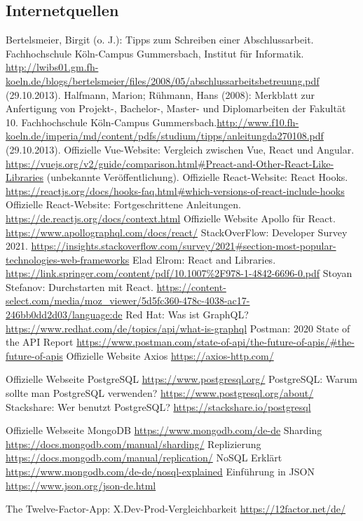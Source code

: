\subsection{Internetquellen}
\begin{thebibliography}{HR08} %
  Bertelsmeier, Birgit (o. J.): Tipps zum Schrei\-b\-en ei\-n\-er Ab\-sch\-luss\-ar\-beit. Fach\-hoch\-schu\-le Köln-Campus Gummersbach, Institut für Informatik. \url{http://lwibs01.gm.fh-koeln.de/blogs/bertelsmeier/files/2008/05/abschlussarbeitsbetreuung.pdf} (29.10.2013).
   Halfmann, Marion; Rühmann, Hans (2008): Merkblatt zur Anfertigung von Projekt-, Bachelor-, Master- und Diplomarbeiten der Fakultät 10. Fachhochschule Köln-Campus Gummersbach.\url{http://www.f10.fh-koeln.de/imperia/md/content/pdfs/studium/tipps/anleitungda270108.pdf} (29.10.2013).
   Offizielle Vue-Website: Vergleich zwischen Vue, React und Angular. \url{https://vuejs.org/v2/guide/comparison.html#Preact-and-Other-React-Like-Libraries} (unbekannte Veröffentlichung).
  Offizielle React-Website: React Hooks. \url{https://reactjs.org/docs/hooks-faq.html#which-versions-of-react-include-hooks}
  Offizielle React-Website: Fortgeschrittene Anleitungen. \url{https://de.reactjs.org/docs/context.html}
  Offizielle Website Apollo für React. \url{https://www.apollographql.com/docs/react/}
  StackOverFlow: Developer Survey 2021. \url{https://insights.stackoverflow.com/survey/2021#section-most-popular-technologies-web-frameworks}
  Elad Elrom: React and Libraries. \url{https://link.springer.com/content/pdf/10.1007%2F978-1-4842-6696-0.pdf}
  Stoyan Stefanov: Durchstarten mit React. \url{https://content-select.com/media/moz_viewer/5d5fc360-478c-4038-ac17-246bb0dd2d03/language:de}
  Red Hat: Was ist GraphQL? \url{https://www.redhat.com/de/topics/api/what-is-graphql}
  Postman: 2020 State of the API Report \url{https://www.postman.com/state-of-api/the-future-of-apis/#the-future-of-apis}
  Offizielle Website Axios \url{https://axios-http.com/}

  Offizielle Webseite PostgreSQL \url{https://www.postgresql.org/}
  PostgreSQL: Warum sollte man PostgreSQL verwenden? \url{https://www.postgresql.org/about/}
  Stackshare: Wer benutzt PostgreSQL? \url{https://stackshare.io/postgresql}

  Offizielle Webseite MongoDB \url{https://www.mongodb.com/de-de}
  Sharding \url{https://docs.mongodb.com/manual/sharding/}
  Replizierung \url{https://docs.mongodb.com/manual/replication/}
  NoSQL Erklärt \url{https://www.mongodb.com/de-de/nosql-explained}
  Einführung in JSON \url{https://www.json.org/json-de.html}

  The Twelve-Factor-App: X.Dev-Prod-Vergleichbarkeit \url{https://12factor.net/de/}


\end{thebibliography}